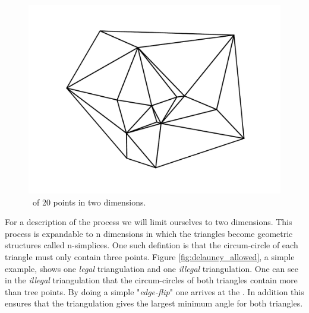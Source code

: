 \begin{figure}[htbp] %
   \centering
   \includegraphics[width=\textwidth]{chapter_ndinterp/plots/simple_delauney.pdf} 
   \caption{\deltri\ of 20 points in two dimensions.}
   \label{fig:delauney_example}
\end{figure}

For a description of the process we will limit ourselves to two dimensions. This process is expandable to n dimensions in which the triangles become geometric structures called n-simplices.
One such defintion is that the circum-circle of each triangle must only contain three points. Figure \ref{fig:delauney_allowed}, a simple example, shows one \textit{legal} triangulation and one \textit{illegal} triangulation. One can see in the \textit{illegal} triangulation that the circum-circles of both triangles contain more than tree points. By doing a simple "\textit{edge-flip}" one arrives at the \deltri. In addition this ensures that the triangulation gives the largest minimum angle for both triangles. 

